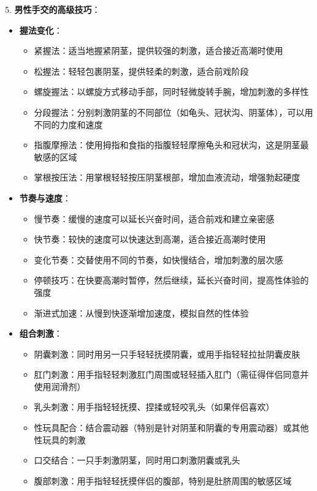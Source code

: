 \documentclass[12pt,UTF8]{ctexbook}
\begin{document}
5. \textbf{男性手交的高级技巧}：
\begin{itemize}
	\item \textbf{握法变化}：
	\begin{itemize}
		\item 紧握法：适当地握紧阴茎，提供较强的刺激，适合接近高潮时使用
		\item 松握法：轻轻包裹阴茎，提供轻柔的刺激，适合前戏阶段
		\item 螺旋握法：以螺旋方式移动手部，同时轻微旋转手腕，增加刺激的多样性
		\item 分段握法：分别刺激阴茎的不同部位（如龟头、冠状沟、阴茎体），可以用不同的力度和速度
		\item 指腹摩擦法：使用拇指和食指的指腹轻轻摩擦龟头和冠状沟，这是阴茎最敏感的区域
		\item 掌根按压法：用掌根轻轻按压阴茎根部，增加血液流动，增强勃起硬度
	\end{itemize}
	\item \textbf{节奏与速度}：
	\begin{itemize}
		\item 慢节奏：缓慢的速度可以延长兴奋时间，适合前戏和建立亲密感
		\item 快节奏：较快的速度可以快速达到高潮，适合接近高潮时使用
		\item 变化节奏：交替使用不同的节奏，如快慢结合，增加刺激的层次感
		\item 停顿技巧：在快要高潮时暂停，然后继续，延长兴奋时间，提高性体验的强度
		\item 渐进式加速：从慢到快逐渐增加速度，模拟自然的性体验
	\end{itemize}
	\item \textbf{组合刺激}：
	\begin{itemize}
		\item 阴囊刺激：同时用另一只手轻轻抚摸阴囊，或用手指轻轻拉扯阴囊皮肤
		\item 肛门刺激：用手指轻轻刺激肛门周围或轻轻插入肛门（需征得伴侣同意并使用润滑剂）
		\item 乳头刺激：用手指轻轻抚摸、捏揉或轻咬乳头（如果伴侣喜欢）
		\item 性玩具配合：结合震动器（特别是针对阴茎和阴囊的专用震动器）或其他性玩具的刺激
		\item 口交结合：一只手刺激阴茎，同时用口刺激阴囊或乳头
		\item 腹部刺激：用手指轻轻抚摸伴侣的腹部，特别是肚脐周围的敏感区域
	\end{itemize}
\end{itemize}
\end{document}
